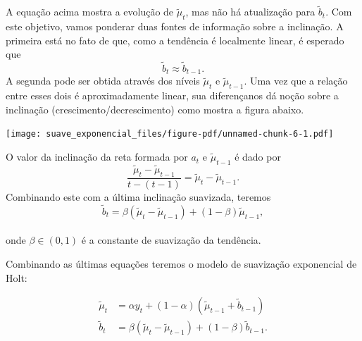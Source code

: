 \documentclass[
  letterpaper,
  DIV=11,
  numbers=noendperiod]{scrreprt}
\theoremstyle{definition}
\theoremstyle{plain}
\theoremstyle{definition}
\theoremstyle{plain}
\theoremstyle{remark}
\begin{document}
A equação acima mostra a evolução de \(\tilde{\mu}_t\), mas não há
atualização para \(\tilde{b}_t\). Com este objetivo, vamos ponderar duas
fontes de informação sobre a inclinação. A primeira está no fato de que,
como a tendência é localmente linear, é esperado que
\[\tilde{b}_t\approx \tilde{b}_{t-1}.\] A segunda pode ser obtida
através dos níveis \(\tilde{\mu}_t\) e \(\tilde{\mu}_{t-1}\). Uma vez
que a relação entre esses dois é aproximadamente linear, sua
diferençanos dá noção sobre a inclinação (crescimento/decrescimento)
como mostra a figura abaixo.

\texttt{[image: suave\_exponencial\_files/figure-pdf/unnamed-chunk-6-1.pdf]}

O valor da inclinação da reta formada por \(a_t\) e
\(\tilde{\mu}_{t-1}\) é dado por
\[\frac{\tilde{\mu}_t - \tilde{\mu}_{t-1}}{t - (t-1)} = \tilde{\mu}_t - \tilde{\mu}_{t-1}.\]
Combinando este com a última inclinação suavizada, teremos
\[\tilde{b}_t = \beta (\tilde{\mu}_t - \tilde{\mu}_{t-1}) + (1-\beta)\tilde{\mu}_{t-1},\]\\
onde \(\beta\in(0,1)\) é a constante de suavização da tendência.

Combinando as últimas equações teremos o modelo de suavização
exponencial de Holt:

\[\begin{align*}
    \tilde{\mu}_t &= \alpha y_t + (1-\alpha)\left( \tilde{\mu}_{t-1} + \tilde{b}_{t-1}\right) \\
    \tilde{b}_t &= \beta (\tilde{\mu}_t - \tilde{\mu}_{t-1}) + (1-\beta)\tilde{b}_{t-1}.
    \end{align*}\]
\end{document}
